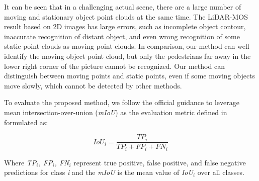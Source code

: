 \documentclass[lettersize,journal]{IEEEtran}
\begin{document}
It can be seen that in a challenging actual scene, there are a large number of moving and stationary object point clouds at the same time. The LiDAR-MOS result based on 2D images has large errors, such as incomplete object contour, inaccurate recognition of distant object, and even wrong recognition of some static point clouds as moving point clouds. In comparison, our method can well identify the moving object point cloud, but only the pedestrians far away in the lower right corner of the picture cannot be recognized. Our method can distinguish between moving points and static points, even if some moving objects move slowly, which cannot be detected by other methods.



To evaluate the proposed method, we follow the official guidance to leverage mean intersection-over-union (\emph{mIoU}) as the evaluation metric defined in \cite{landrieu2018large} formulated as:

\begin{equation}
 IoU_i = \frac{TP_i}{TP_i+FP_i+FN_i} 
\end{equation}

Where \emph{TP$_i$, FP$_i$, FN$_i$} represent true positive, false positive, and false negative predictions for class \emph{i} and the \emph{mIoU} is the mean value of \emph{IoU$_i$} over all classes.
\end{document}
